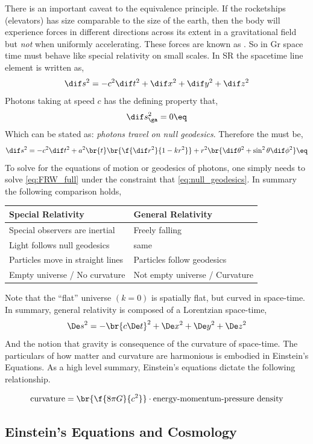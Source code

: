 \documentclass{article}
\begin{document}
There is an important caveat to the equivalence principle. If the rocketships (elevators) has size comparable to the size of the earth, then the body will experience forces in different directions across its extent in a gravitational field but \textit{not} when uniformly accelerating. These forces are known as . So in Gr space time must behave like special relativity on small scales. In SR the spacetime line element is written as,
\[ \dif s^2 = - c^2 \dif t^2 + \dif x^2 + \dif y^2 + \dif z^2 \]
Photons taking at speed $c$ has the defining property that,
\[ \dif s^2_\ga  = 0 \eq \label{eq:null_geodesics}\]
Which can be stated as: \textit{photons travel on null geodesics}. Therefore the  must be,
\[ \dif s^2 = - c^2 \dif t^2 + a^2\br{t}\br{\f{\dif r^2}{1 - kr^2}} + r^2 \br{\dif \theta^2 + \sin^2 \theta \dif \phi^2} \eq \label{eq:FRW_full}\]
To solve for the equations of motion or geodesics of photons, one simply needs to solve \cref{eq:FRW_full} under the constraint that \cref{eq:null_geodesics}. In summary the following comparison holds,
\begin{center}
\begin{tabular}{|l|l|}
    \hline
    Special Relativity & General Relativity \\
    \hline
    Special observers are inertial & Freely falling \\
    Light follows null geodesics & same \\
    Particles move in straight lines & Particles follow geodesics \\
    Empty universe / No curvature & Not empty universe / Curvature \\
    \hline
\end{tabular}
\end{center}
Note that the ``flat'' universe $(k=0)$ is spatially flat, but curved in space-time. \\

In summary, general relativity is composed of a Lorentzian space-time,
\[ \De s^2 = - \br{c \De t}^2 + \De x^2 + \De y^2 + \De z^2\]
And the notion that gravity is consequence of the curvature of space-time. The particulars of how matter and curvature are harmonious is embodied in Einstein's Equations. As a high level summary, Einstein's equations dictate the following relationship.

\[ \text{curvature} = \br{\f{8\pi G}{c^2}} \cdot \text{energy-momentum-pressure density} \]

\subsection{Einstein's Equations and Cosmology}
\end{document}
